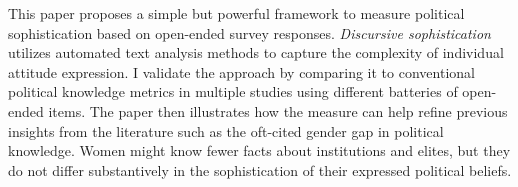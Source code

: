 This paper proposes a simple but powerful framework to measure political sophistication based on open-ended survey responses. \textit{Discursive sophistication} utilizes automated text analysis methods to capture the complexity of individual attitude expression. I validate the approach by comparing it to conventional political knowledge metrics in multiple studies using different batteries of open-ended items. The paper then illustrates how the measure can help refine previous insights from the literature such as the oft-cited gender gap in political knowledge. Women might know fewer facts about institutions and elites, but they do not differ substantively in the sophistication of their expressed political beliefs.